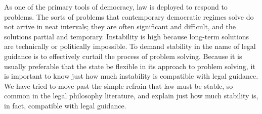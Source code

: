 As one of the primary tools of democracy, law is deployed to respond to
problems. The sorts of problems that contemporary democratic regimes
solve do not arrive in neat intervals; they are often significant and
difficult, and the solutions partial and temporary. Instability is high
because long-term solutions are technically or politically impossible.
To demand stability in the name of legal guidance is to effectively
curtail the process of problem solving. Because it is usually preferable
that the state be flexible in its approach to problem solving, it is
important to know just how much instability is compatible with legal
guidance. We have tried to move past the simple refrain that law must be
stable, so common in the legal philosophy literature, and explain just
how much stability is, in fact, compatible with legal guidance.
